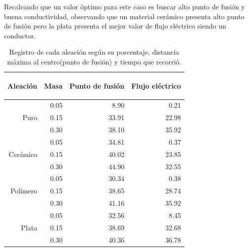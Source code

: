 \documentclass[3pt,twocolumn]{elsarticle}
\begin{document}
Recalcando que un valor óptimo para este caso es buscar alto punto de fusión y buena conductividad, observando que un material cerámico presenta alto punto de fusión  pero la plata presenta el mejor valor de flujo eléctrico siendo un conductor.

\begin{table}[H]
        \caption{Registro de cada aleación según su porcentaje, distancia máxima al centro(punto de fusión) y tiempo que recorrió.}
        \bigskip
        \label{tab1}
        \centering
        \begin{adjustbox}{width=\columnwidth,center}
        \begin{tabular}{|r|r|r|r|}
        \hline
         \begin{turn}{60}Aleación\end{turn}&
         \begin{turn}{60}Masa\end{turn}&
         \begin{turn}{60}Punto de fusión\end{turn}&
         \begin{turn}{60}Flujo eléctrico\end{turn} \\
        \hline
              & 0.05 &8.90&0.21   \\
        Puro  & 0.15 &33.91&22.98 \\
              & 0.30 &38.10&35.92 \\
        \hline
              & 0.05  &34.81& 0.37  \\
        Cerámico& 0.15 &40.02&23.85 \\
              & 0.30 &44.90&32.55 \\
        \hline
              & 0.05  &30.34& 0.38   \\
        Polímero& 0.15 &38.65& 28.74\\
              & 0.30 &41.16&35.92 \\
        \hline
              & 0.05 & 32.56 &8.45\\
        Plata & 0.15 &38.69& 32.68\\
              & 0.30 &40.36&36.78 \\
        \hline
        \end{tabular}
        \end{adjustbox}
    \end{table}
    
\end{document}
